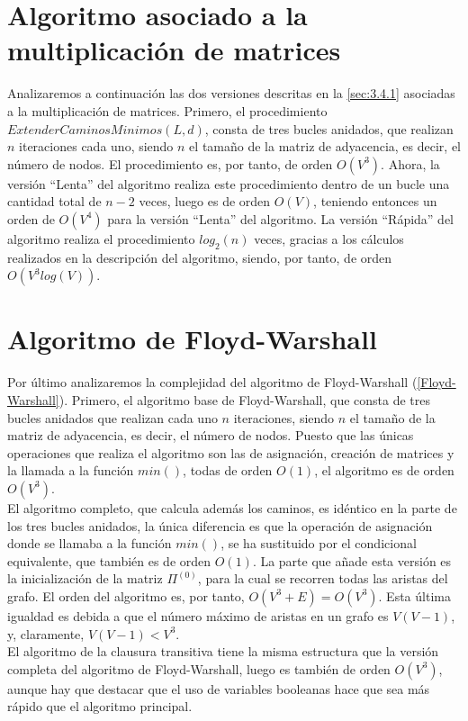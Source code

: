 \section{Algoritmo asociado a la multiplicación de matrices}

Analizaremos a continuación las dos versiones descritas en la \autoref{sec:3.4.1} asociadas a la multiplicación de matrices. Primero, el procedimiento $ExtenderCaminosMinimos(L,d)$, consta de tres bucles anidados, que realizan $n$ iteraciones cada uno, siendo $n$ el tamaño de la matriz de adyacencia, es decir, el número de nodos. El procedimiento es, por tanto, de orden $O(V^3)$. Ahora, la versión ``Lenta'' del algoritmo realiza este procedimiento dentro de un bucle una cantidad total de $n-2$ veces, luego es de orden $O(V)$, teniendo entonces un orden de $O(V^4)$ para la versión ``Lenta'' del algoritmo. La versión ``Rápida'' del algoritmo realiza el procedimiento $log_2(n)$ veces, gracias a los cálculos realizados en la descripción del algoritmo, siendo, por tanto, de orden $O(V^3log(V))$.

\section{Algoritmo de Floyd-Warshall}

Por último analizaremos la complejidad del algoritmo de Floyd-Warshall (\autoref{Floyd-Warshall}). Primero, el algoritmo base de Floyd-Warshall, que consta de tres bucles anidados que realizan cada uno $n$ iteraciones, siendo $n$ el tamaño de la matriz de adyacencia, es decir, el número de nodos. Puesto que las únicas operaciones que realiza el algoritmo son las de asignación, creación de matrices y la llamada a la función $min()$, todas de orden $O(1)$, el algoritmo es de orden $O(V^3)$. \\

El algoritmo completo, que calcula además los caminos, es idéntico en la parte de los tres bucles anidados, la única diferencia es que la operación de asignación donde se llamaba a la función $min()$, se ha sustituido por el condicional equivalente, que también es de orden $O(1)$. La parte que añade esta versión es la inicialización de la matriz $\Pi^{(0)}$, para la cual se recorren todas las aristas del grafo. El orden del algoritmo es, por tanto, $O(V^3 + E) = O(V^3)$. Esta última igualdad es debida a que el número máximo de aristas en un grafo es $V(V-1)$, y, claramente, $V(V-1)<V^3$. \\

El algoritmo de la clausura transitiva tiene la misma estructura que la versión completa del algoritmo de Floyd-Warshall, luego es también de orden $O(V^3)$, aunque hay que destacar que el uso de variables booleanas hace que sea más rápido que el algoritmo principal.

\endinput



